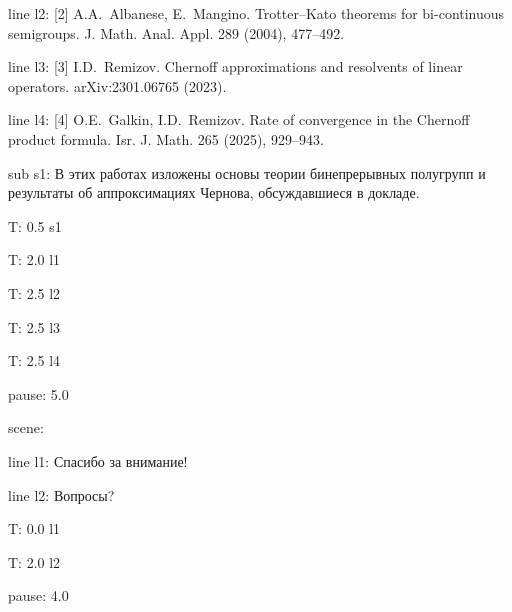 \documentclass[a4paper,11pt]{article}
\begin{document}
line l2: {[2] A.A.~Albanese, E.~Mangino. Trotter--Kato theorems for bi-continuous semigroups. J. Math. Anal. Appl. 289 (2004), 477--492.}

line l3: {[3] I.D.~Remizov. Chernoff approximations and resolvents of linear operators. arXiv:2301.06765 (2023).}

line l4: {[4] O.E.~Galkin, I.D.~Remizov. Rate of convergence in the Chernoff product formula. Isr. J. Math. 265 (2025), 929--943.}


sub s1: {В этих работах изложены основы теории бинепрерывных полугрупп и результаты об аппроксимациях Чернова, обсуждавшиеся в докладе.}


T: 0.5 s1

T: 2.0 l1

T: 2.5 l2

T: 2.5 l3

T: 2.5 l4

pause: 5.0



scene: {}

line l1: {\Huge Спасибо за внимание!}

line l2: {\Large Вопросы?}


T: 0.0 l1

T: 2.0 l2

pause: 4.0
\end{document}
